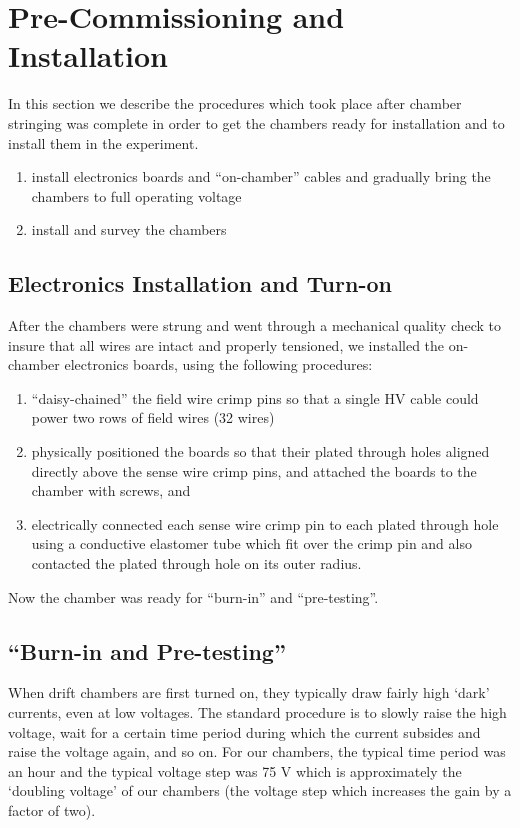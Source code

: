 \section{Pre-Commissioning and Installation}

In this section we describe the procedures which took
place after chamber stringing was complete in order to get the
chambers ready for installation and to install them 
in the experiment.

\begin{enumerate}
\item install electronics boards and ``on-chamber'' cables
and gradually bring the chambers to full operating voltage 
\item install and survey the chambers
\end{enumerate}

\subsection{Electronics Installation and Turn-on}
After the chambers were strung and went through a mechanical quality
check to insure that all wires are intact and properly tensioned, we
installed the on-chamber electronics boards, using
the following procedures:
\begin{enumerate}
\item ``daisy-chained'' the field wire crimp pins so that a single
HV cable could power two rows of field wires (32 wires)
\item physically positioned the boards so that their plated through
holes aligned directly above the sense wire crimp pins, and attached
the boards to the chamber with screws, and
\item electrically connected each sense wire crimp pin to each
plated through hole using a conductive elastomer tube which fit
over the crimp pin and also contacted the plated through hole on
its outer radius.
\end{enumerate}

Now the chamber was ready for ``burn-in'' and ``pre-testing''.

\subsection{``Burn-in and Pre-testing''}
When drift chambers are first turned on, they typically draw fairly high
`dark' currents, even at low voltages.  The standard procedure is to
slowly raise the high voltage, wait for a certain time period during
which the current subsides and raise the voltage again, and so on.
For our chambers, the typical time period was an hour and the typical
voltage step was 75 V which is approximately the `doubling voltage' of
our chambers (the voltage step which increases the gain by a factor
of two).

